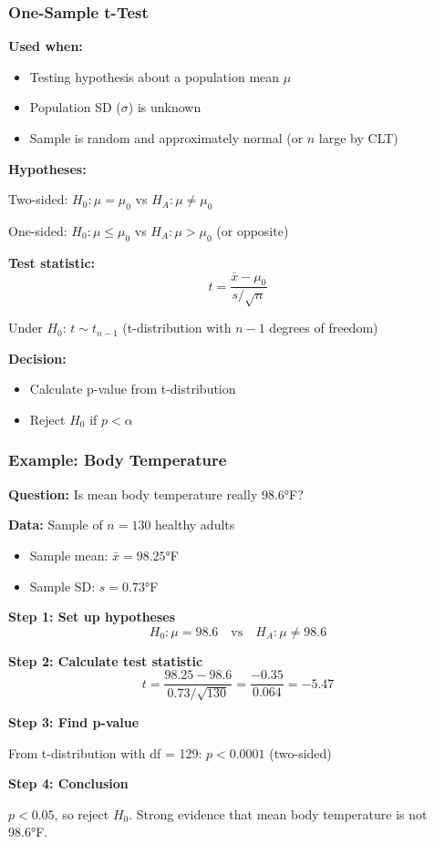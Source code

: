 \documentclass{beamer}
\begin{document}
\begin{frame}
\frametitle{One-Sample t-Test}
\textbf{Used when:}
\begin{itemize}
\item Testing hypothesis about a population mean $\mu$
\item Population SD ($\sigma$) is unknown
\item Sample is random and approximately normal (or $n$ large by CLT)
\end{itemize}

\vspace{0.1cm}
\textbf{Hypotheses:}

Two-sided: $H_0: \mu = \mu_0$ vs $H_A: \mu \neq \mu_0$

One-sided: $H_0: \mu \leq \mu_0$ vs $H_A: \mu > \mu_0$ (or opposite)

\vspace{0.1cm}
\textbf{Test statistic:}
$$t = \frac{\bar{x} - \mu_0}{s/\sqrt{n}}$$

\vspace{0.1cm}
Under $H_0$: $t \sim t_{n-1}$ (t-distribution with $n-1$ degrees of freedom)

\vspace{0.1cm}
\textbf{Decision:}
\begin{itemize}
\item Calculate p-value from t-distribution
\item Reject $H_0$ if $p < \alpha$
\end{itemize}
\end{frame}

\begin{frame}
\frametitle{Example: Body Temperature}
\textbf{Question:} Is mean body temperature really 98.6°F?

\vspace{0.1cm}
\textbf{Data:} Sample of $n = 130$ healthy adults
\begin{itemize}
\item Sample mean: $\bar{x} = 98.25$°F
\item Sample SD: $s = 0.73$°F
\end{itemize}

\vspace{0.1cm}
\textbf{Step 1: Set up hypotheses}
$$H_0: \mu = 98.6 \quad \text{vs} \quad H_A: \mu \neq 98.6$$

\vspace{0.1cm}
\textbf{Step 2: Calculate test statistic}
$$t = \frac{98.25 - 98.6}{0.73/\sqrt{130}} = \frac{-0.35}{0.064} = -5.47$$

\vspace{0.1cm}
\textbf{Step 3: Find p-value}

From t-distribution with df = 129: $p < 0.0001$ (two-sided)

\vspace{0.1cm}
\textbf{Step 4: Conclusion}

$p < 0.05$, so reject $H_0$. Strong evidence that mean body temperature is not 98.6°F.
\end{frame}
\end{document}
